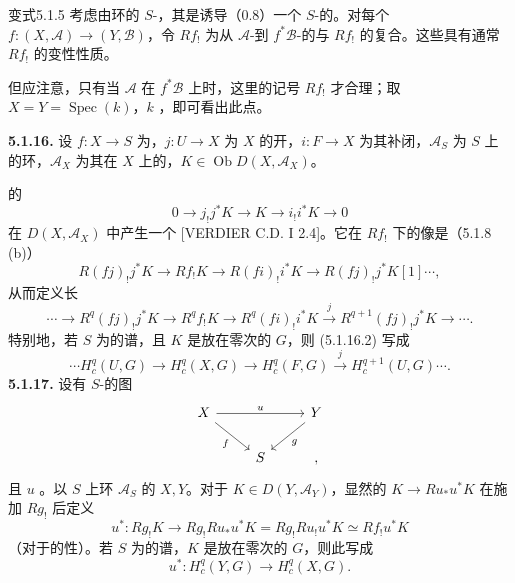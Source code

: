 \begin{SGAresult}{变式}{5.1.5}
考虑由环的 $S$-，其是诱导（0.8）一个 $S$-的。对每个 $f:(X,\mathscr A)\to(Y,\mathscr B)$，令 $Rf_!$ 为从 $\mathscr A$-到 $f^*\mathscr B$-的与 $Rf_!$ 的复合。这些具有通常 $Rf_!$ 的变性性质。
\end{SGAresult}
但应注意，只有当 $\mathscr A$ 在 $f^*\mathscr B$ 上时，这里的记号 $Rf_!$ 才合理；取 $X=Y=\operatorname{Spec}(k)$，$k$ ，即可看出此点。

\textbf{5.1.16.} 设 $f:X\to S$ 为，$j:U\to X$ 为 $X$ 的开，$i:F\to X$ 为其补闭，$\mathscr A_S$ 为 $S$ 上的环，$\mathscr A_X$ 为其在 $X$ 上的，$K\in\operatorname{Ob}D(X,\mathscr A_X)$。

的
\[0\longrightarrow j_!j^*K\longrightarrow K\longrightarrow i_!i^*K\longrightarrow0\]
在 $D(X,\mathscr A_X)$ 中产生一个 [VERDIER C.D. I 2.4]。它在 $Rf_!$ 下的像是（5.1.8 (b)）
\[R(fj)_!j^*K\longrightarrow Rf_!K\longrightarrow R(fi)_!i^*K\longrightarrow R(fj)_!j^*K[1]\cdots,\tag{5.1.16.1}\]
从而定义长
\[\cdots\longrightarrow R^q(fj)_!j^*K\longrightarrow R^qf_!K\longrightarrow R^q(fi)_!i^*K\xrightarrow{j}R^{q+1}(fj)_!j^*K\longrightarrow\cdots.\tag{5.1.16.2}\]
特别地，若 $S$ 为的谱，且 $K$ 是放在零次的 $G$，则 (5.1.16.2) 写成
\[\cdots H_c^q(U,G)\longrightarrow H_c^q(X,G)\longrightarrow H_c^q(F,G)\xrightarrow{j}H_c^{q+1}(U,G)\cdots.\tag{5.1.16.3}\]
\textbf{5.1.17.} 设有 $S$-的图
\[\begin{tikzcd}X\arrow[rr,"u"]\arrow[dr,"f"']&&Y\arrow[dl,"g"]\\&S&,\end{tikzcd}\]
且 $u$ 。以 $S$ 上环 $\mathscr A_S$ 的 $X,Y$。对于 $K\in D(Y,\mathscr A_Y)$，显然的 $K\to Ru_*u^*K$ 在施加 $Rg_!$ 后定义
\[u^*:Rg_!K\longrightarrow Rg_!Ru_*u^*K=Rg_!Ru_!u^*K\simeq Rf_!u^*K\tag{5.1.17.1}\]
（对于的性）。若 $S$ 为的谱，$K$ 是放在零次的 $G$，则此写成
\[u^*:H_c^q(Y,G)\longrightarrow H_c^q(X,G).\tag{5.1.17.2}\]

